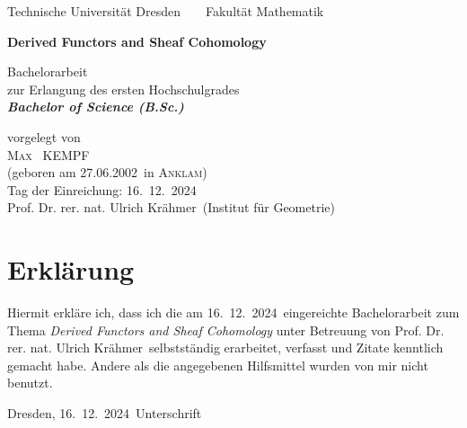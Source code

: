 \documentclass[a4paper,12pt,leqno]{report}
\newcommand{\name}{Kempf}
\newcommand{\vorname}{Max}
\newcommand{\gebdatum}{27.06.2002}
\newcommand{\ort}{Anklam}
\newcommand{\betreuer}{Prof. Dr. rer. nat. Ulrich Krähmer}
\newcommand{\institut}{Institut für Geometrie}
\newcommand{\thema}{Derived Functors and Sheaf Cohomology}
\newcommand{\datum}{16.\ 12.\ 2024} %
\begin{document}

\thispagestyle{empty}

\begin{center}
{\Large Technische Universit\"{a}t Dresden\  \ \textbullet\ \ Fakult\"{a}t Mathematik}

\vfil

{\bfseries\Huge\thema}

\vfil
{\LARGE
Bachelorarbeit \\[\bigskipamount]
zur Erlangung des ersten Hochschulgrades\\[\bigskipamount]
\bfseries{\itshape Bachelor of Science  \textup{(}B.Sc.\textup{)}}\\[\bigskipamount]
}

\vfil\vfil

\vfil

vorgelegt von
\\[\bigskipamount]
\textsc{\vorname\ } \MakeUppercase{\name}
\\[\bigskipamount]
(geboren am \gebdatum\ in \textsc{\ort})
\\[\bigskipamount]
Tag der Einreichung: \datum
\\[\bigskipamount]
\betreuer\ (\institut)
\end{center}

\cleardoublepage


\chapter*{Erkl\"{a}rung}
\thispagestyle{empty}
Hiermit erkl\"{a}re ich, dass ich die am \datum\ eingereichte Bachelorarbeit zum Thema
\emph{\thema} unter Betreuung von \betreuer\ selbstst\"{a}ndig erarbeitet,
verfasst und Zitate kenntlich gemacht habe. Andere als die angegebenen Hilfsmittel
wurden von mir nicht benutzt.

\bigskip \bigskip \bigskip \bigskip \bigskip

Dresden, \datum\ \hfill Unterschrift

\normalsize
\end{document}
